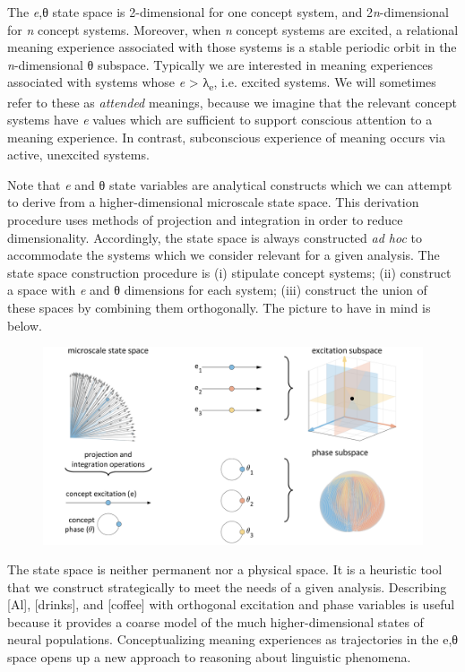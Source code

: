   The \textit{e},θ state space is 2-dimensional for one concept system, and 2\textit{n}{}-dimensional for \textit{n} concept systems. Moreover, when \textit{n} concept systems are excited, a relational meaning experience associated with those systems is a stable periodic orbit in the \textit{n}{}-dimensional θ subspace. Typically we are interested in meaning experiences associated with systems whose \textit{e} > λ\textsubscript{e}, i.e. excited systems. We will sometimes refer to these as \textit{attended} meanings, because we imagine that the relevant concept systems have \textit{e} values which are sufficient to support conscious attention to a meaning experience. In contrast, subconscious experience of meaning occurs via active, unexcited systems.

  Note that \textit{e} and θ state variables are analytical constructs which we can attempt to derive from a higher-dimensional microscale state space. This derivation procedure uses methods of projection and integration in order to reduce dimensionality. Accordingly, the state space is always constructed \textit{ad hoc} to accommodate the systems which we consider relevant for a given analysis. The state space construction procedure is (i) stipulate concept systems; (ii) construct a space with \textit{e} and θ dimensions for each system; (iii) construct the union of these spaces by combining them orthogonally. The picture to have in mind is below. 

  
\begin{figure}
\includegraphics[width=\textwidth]{figures/Tilsen-img14.png}
\caption{\missingcaption}
\label{fig:2:7}
\end{figure}
 

  The state space is neither permanent nor a physical space. It is a heuristic tool that we construct strategically to meet the needs of a given analysis. Describing [Al], [drinks], and [coffee] with orthogonal excitation and phase variables is useful because it provides a coarse model of the much higher-dimensional states of neural populations. Conceptualizing meaning experiences as trajectories in the e,θ space opens up a new approach to reasoning about linguistic phenomena.

